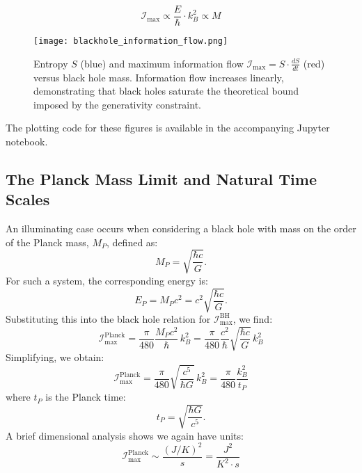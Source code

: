 \documentclass[12pt]{article}
\begin{document}
\[
\mathcal{I}_{\max} \propto \frac{E}{\hbar} \cdot k_B^2 \propto M
\]

\begin{figure}[H]
\centering
\texttt{[image: blackhole\_information\_flow.png]}
\caption{
Entropy \( S \) (blue) and maximum information flow \( \mathcal{I}_{\max} = S \cdot \frac{dS}{dt} \) (red) versus black hole mass. Information flow increases linearly, demonstrating that black holes saturate the theoretical bound imposed by the generativity constraint.
}
\end{figure}

\noindent
The plotting code for these figures is available in the accompanying Jupyter notebook.


\subsection{The Planck Mass Limit and Natural Time Scales}

An illuminating case occurs when considering a black hole with mass on the order of the Planck mass, \( M_P \), defined as:
\begin{equation}
    M_P = \sqrt{\frac{\hbar c}{G}}.
\end{equation}
For such a system, the corresponding energy is:
\begin{equation}
    E_P = M_P c^2 = c^2 \sqrt{\frac{\hbar c}{G}}.
\end{equation}
Substituting this into the black hole relation for \(\mathcal{I}_{\text{max}}^{\text{BH}}\), we find:
\begin{equation}
    \mathcal{I}_{\text{max}}^{\text{Planck}} = \frac{\pi}{480} \frac{M_P c^2}{\hbar} \, k_B^2
    = \frac{\pi}{480} \frac{c^2}{\hbar} \sqrt{\frac{\hbar c}{G}} \, k_B^2
\end{equation}
Simplifying, we obtain:
\begin{equation}
    \mathcal{I}_{\text{max}}^{\text{Planck}} = \frac{\pi}{480} \sqrt{\frac{c^5}{\hbar G}} \, k_B^2
    = \frac{\pi}{480} \frac{k_B^2}{t_P}
\end{equation}
where \( t_P \) is the Planck time:
\begin{equation}
    t_P = \sqrt{\frac{\hbar G}{c^5}}.
\end{equation}
A brief dimensional analysis shows we again have units:
\begin{equation}
    \mathcal{I}_{\text{max}}^{\text{Planck}} \sim \frac{(J/K)^2}{s}
    = \frac{J^2}{K^2 \cdot s}
\end{equation}
\end{document}
